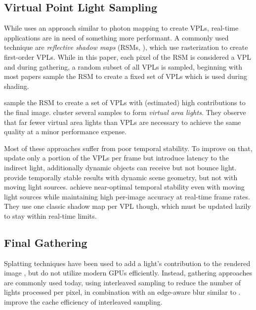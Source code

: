\subsection{Virtual Point Light Sampling}
\label{sec:intro:relatedWorkManyLight:vplSampling}

While \citet{Keller:1997:InstantRadiosity} uses an approach similar to photon mapping to create VPLs, real-time applications are in need of something more performant. A commonly used technique are \emph{reflective shadow maps} (RSMs, \cite{Dachsbacher:2005:RSM}), which use rasterization to create first-order VPLs. While in this paper, each pixel of the RSM is considered a VPL and during gathering, a random subset of all VPLs is sampled, beginning with \citet{dachsbacher2006splatting} most papers sample the RSM to create a fixed set of VPLs which is used during shading.

\citet{georgiev2010simple, ritschel2011ismsViewAdaptive} sample the RSM to create a set of VPLs with (estimated) high contributions to the final image. \citet{dong2009real, prutkin2012reflective} cluster several samples to form \emph{virtual area lights}. They observe that far fewer virtual area lights than VPLs are necessary to achieve the same quality at a minor performance expense.

Most of these approaches suffer from poor temporal stability. To improve on that, \citet{laine2007incremental} update only a portion of the VPLs per frame but introduce latency to the indirect light, additionally dynamic objects can receive but not bounce light. \citet{barak2013temporally} provide temporally stable results with dynamic scene geometry, but not with moving light sources. \citet{hedman2016sequential} achieve near-optimal temporal stability even with moving light sources while maintaining high per-image accuracy at real-time frame rates. They use one classic shadow map per VPL though, which must be updated lazily to stay within real-time limits.


\subsection{Final Gathering}
\label{sec:intro:relatedWorkManyLight:finalGathering}

Splatting techniques have been used to add a light's contribution to the rendered image \citep{dachsbacher2006splatting, Nichols:2009:splatting}, but do not utilize modern GPUs efficiently. Instead, gathering approaches are commonly used today, using interleaved sampling \citep{Keller:2001:InterleavedSampling} to reduce the number of lights processed per pixel, in combination with an edge-aware blur similar to \citet{laine2007incremental}. \citet{segovia2006non} improve the cache efficiency of interleaved sampling.



